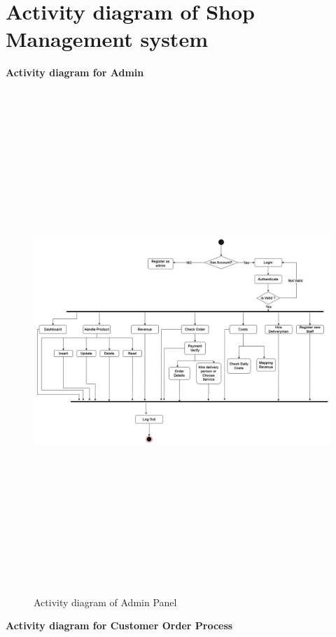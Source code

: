 \section{Activity diagram of Shop Management system}
\textbf{Activity diagram for Admin}\\
\begin{figure}[ht]
    \centering  
    \includegraphics[width=\textwidth,height=19cm]{acivity diagram/admin activity.jpg}    
    \caption{Activity diagram of Admin Panel}
    \label{fig:fig 4.11}
\end{figure}
\newpage
\textbf{Activity diagram for Customer Order Process}\\
